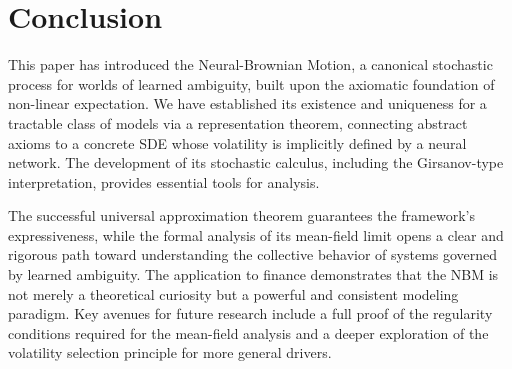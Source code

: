 \documentclass[qian]{imsart}
\theoremstyle{plain}
\theoremstyle{definition}
\begin{document}
\section{Conclusion}
This paper has introduced the Neural-Brownian Motion, a canonical stochastic process for worlds of learned ambiguity, built upon the axiomatic foundation of non-linear expectation. We have established its existence and uniqueness for a tractable class of models via a representation theorem, connecting abstract axioms to a concrete SDE whose volatility is implicitly defined by a neural network. The development of its stochastic calculus, including the Girsanov-type interpretation, provides essential tools for analysis. 

The successful universal approximation theorem guarantees the framework's expressiveness, while the formal analysis of its mean-field limit opens a clear and rigorous path toward understanding the collective behavior of systems governed by learned ambiguity. The application to finance demonstrates that the NBM is not merely a theoretical curiosity but a powerful and consistent modeling paradigm. Key avenues for future research include a full proof of the regularity conditions required for the mean-field analysis and a deeper exploration of the volatility selection principle for more general drivers.

 

\end{document}
